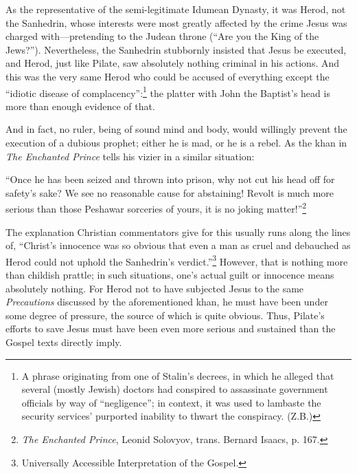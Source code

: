 As the representative of the semi-legitimate Idumean Dynasty, it was Herod, not the Sanhedrin, whose interests were most greatly affected by the crime Jesus was charged with---pretending to the Judean throne (``Are you the King of the Jews?''). Nevertheless, the Sanhedrin stubbornly insisted that Jesus be executed, and Herod, just like Pilate, saw absolutely nothing criminal in his actions. And this was the very same Herod who could be accused of everything except the ``idiotic disease of complacency'':\footnote{A phrase originating from one of Stalin's decrees, in which he alleged that several (mostly Jewish) doctors had conspired to assassinate government officials by way of ``negligence''; in context, it was used to lambaste the security services' purported inability to thwart the conspiracy. (Z.B.)} the platter with John the Baptist's head is more than enough evidence of that.

And in fact, no ruler, being of sound mind and body, would willingly prevent
the execution of a dubious prophet; either he is mad, or he is a rebel. As the khan
in \emph{The Enchanted Prince} tells his vizier in a similar situation:

\begin{smallquote}
    ``Once he has been seized and thrown into prison, why not cut his head off for safety's sake? We see no reasonable cause for abstaining! Revolt is much more serious than those Peshawar sorceries of yours, it is no joking matter!''\footnote{\emph{The Enchanted Prince}, Leonid Solovyov, trans. Bernard Isaacs, p. 167.}
\end{smallquote}

The explanation Christian commentators give for this usually runs along the lines of, ``Christ's innocence was so obvious that even a man as cruel and debauched as Herod could not uphold the Sanhedrin's verdict.''\footnote{ Universally Accessible Interpretation of the Gospel.} However, that is nothing more than childish prattle; in such situations, one's actual guilt or innocence means absolutely nothing. For Herod not to have subjected Jesus to the same \emph{Precautions} discussed by the aforementioned khan, he must have been under some degree of pressure, the source of which is quite obvious. Thus, Pilate's efforts to save Jesus must have been even more serious and sustained than the Gospel texts directly imply.

